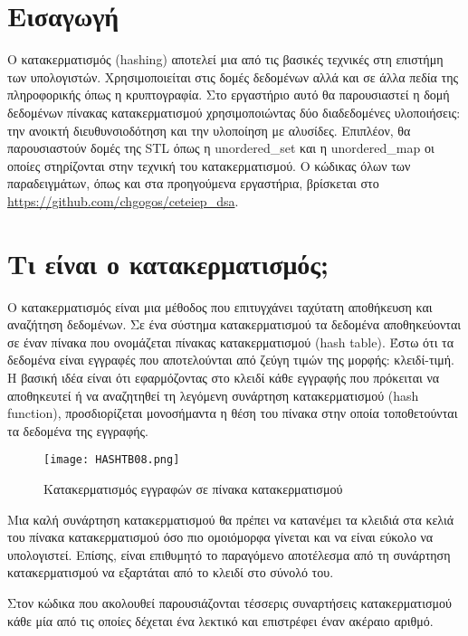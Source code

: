 \section{Εισαγωγή}
Ο κατακερματισμός (hashing) αποτελεί μια από τις βασικές τεχνικές στη επιστήμη των υπολογιστών. Χρησιμοποιείται στις δομές δεδομένων αλλά και σε άλλα πεδία της πληροφορικής όπως η κρυπτογραφία. Στο εργαστήριο αυτό θα παρουσιαστεί η δομή δεδομένων πίνακας κατακερματισμού χρησιμοποιώντας δύο διαδεδομένες υλοποιήσεις: την ανοικτή διευθυνσιοδότηση και την υλοποίηση με αλυσίδες. Επιπλέον, θα παρουσιαστούν δομές της STL όπως η unordered\_set και η unordered\_map οι οποίες στηρίζονται στην τεχνική του κατακερματισμού. Ο κώδικας όλων των παραδειγμάτων, όπως και στα προηγούμενα εργαστήρια, βρίσκεται στο \href{https://github.com/chgogos/ceteiep_dsa}{https://github.com/chgogos/ceteiep\_dsa}.

\section{Τι είναι ο κατακερματισμός;}
Ο κατακερματισμός είναι μια μέθοδος που επιτυγχάνει ταχύτατη αποθήκευση και αναζήτηση δεδομένων. Σε ένα σύστημα κατακερματισμού τα δεδομένα αποθηκεύονται σε έναν πίνακα που ονομάζεται πίνακας κατακερματισμού (hash table). Έστω ότι τα δεδομένα είναι εγγραφές που αποτελούνται από ζεύγη τιμών της μορφής: κλειδί-τιμή. Η βασική ιδέα είναι ότι εφαρμόζοντας στο κλειδί κάθε εγγραφής που πρόκειται να αποθηκευτεί ή να αναζητηθεί τη λεγόμενη συνάρτηση κατακερματισμού (hash function), προσδιορίζεται μονοσήμαντα η θέση του πίνακα στην οποία τοποθετούνται τα δεδομένα της εγγραφής.

\begin{figure}[ht]
\centering
\texttt{[image: HASHTB08.png]}
\caption{Κατακερματισμός εγγραφών σε πίνακα κατακερματισμού \cite{wiki_hashtables}}
\label{fig:hashtable1}
\end{figure}

Μια καλή συνάρτηση κατακερματισμού θα πρέπει να κατανέμει τα κλειδιά στα κελιά του πίνακα κατακερματισμού όσο πιο ομοιόμορφα γίνεται και να είναι εύκολο να υπολογιστεί. Επίσης, είναι επιθυμητό το παραγόμενο αποτέλεσμα από τη συνάρτηση κατακερματισμού να εξαρτάται από το κλειδί στο σύνολό του.

Στον κώδικα που ακολουθεί παρουσιάζονται τέσσερις συναρτήσεις κατακερματισμού κάθε μία από τις οποίες δέχεται ένα λεκτικό και επιστρέφει έναν ακέραιο αριθμό.



